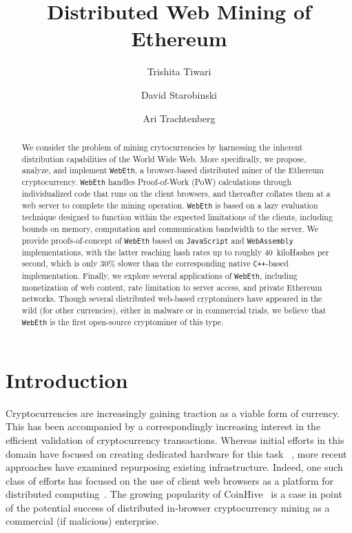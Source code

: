 \documentclass[runningheads]{llncs}
\begin{document}
%
\title{Distributed Web Mining of Ethereum
}
\author{
Trishita Tiwari
\and
David Starobinski
\and
Ari Trachtenberg
}
%
%
%
\maketitle             
%
\begin{abstract}
We consider the problem of mining crytocurrencies by harnessing the inherent distribution capabilities of the World Wide Web. More specifically, we propose, analyze, and implement \verb|WebEth|, a browser-based distributed miner of the Ethereum cryptocurrency. \verb|WebEth| handles Proof-of-Work (PoW) calculations through individualized code that runs on the client browsers, and thereafter collates them at a web server to complete the mining operation. \verb|WebEth| is based on a lazy evaluation technique designed to function within the expected limitations of the clients, including bounds on memory, computation and communication bandwidth to the server. We provide proofs-of-concept of \verb|WebEth| based on \verb|JavaScript| and \verb|WebAssembly| implementations, with the latter reaching hash rates up to roughly 40~kiloHashes per second, which is only 30\% slower than the corresponding native \verb|C++|-based implementation.
Finally, we explore several applications of \verb|WebEth|, including monetization of web content, rate limitation to server access, and private Ethereum networks. Though several distributed web-based cryptominers have appeared in the wild (for other currencies), either in malware or in commercial trials, we believe that \verb|WebEth| is the first open-source cryptominer of this type.

\end{abstract}
%
%
%
\section{Introduction}
Cryptocurrencies are increasingly gaining traction as a viable form of currency.  This has been accompanied by a correspondingly increasing interest in the efficient validation of cryptocurrency transactions.  Whereas initial efforts in this domain have focused on creating dedicated hardware for this task ~\cite{asics}, more recent approaches have examined repurposing existing infrastructure. Indeed, one such class of efforts has focused on the use of client web browsers as a platform for distributed computing~\cite{Cushing}. The growing popularity of CoinHive~\cite{coinhive} is a case in point of the potential success of distributed in-browser cryptocurrency mining as a commercial (if malicious) enterprise. 
\end{document}
